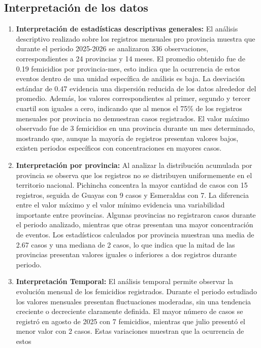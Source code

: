 \documentclass[11pt]{article}
\begin{document}
\subsection{Interpretación de los datos}
\label{sec:orge55c5dd}
\begin{enumerate}
\item \textbf{\textbf{Interpretación de estadísticas descriptivas generales:}}
El análisis descriptivo realizado sobre los registros mensuales pro
provincia muestra que durante el periodo 2025-2026 se analizaron
336 observaciones, correspondientes a 24 provincias y 14 meses. El
promedio obtenido fue de 0.19 femicidios por provincia-mes, esto
indica que la ocurrencia de estos eventos dentro de una unidad
específica de análisis es baja.
La desviación estándar de 0.47 evidencia una dispersión reducida de
los datos alrededor del promedio. Además, los valores
correspondientes al primer, segundo y tercer cuartil son iguales a
cero, indicando que al menos el 75\% de los registros mensuales por
provincia no demuestran casos registrados.
El valor máximo observado fue de 3 femicidios en una provincia
durante un mes determinado, mostrando que, aunque la mayoría de
registros presentan valores bajos, existen periodos específicos con
concentraciones en mayores casos.
\item \textbf{\textbf{Interpretación por provincia:}}
Al analizar la distribución acumulada por provincia se observa que
los registros no se distribuyen uniformemente en el territorio
nacional. Pichincha concentra la mayor cantidad de casos con 15
registros, seguida de Guayas con 9 casos y Esmeraldas con 7.
La diferencia entre el valor máximo y el valor mínimo evidencia una
variabilidad importante entre provincias. Algunas provincias no
registraron casos durante el periodo analizado, mientras que otras
presentan una mayor concentración de eventos.
Los estadísticos calculados por provincia muestran una media de
2.67 casos y una mediana de 2 casos, lo que indica que la mitad de
las provincias presentan valores iguales o inferiores a dos
registros durante periodo.
\item \textbf{\textbf{Interpretación Temporal:}}
El análisis temporal permite observar la evolución mensual de los
femicidios registrados. Durante el periodo estudiado los valores
mensuales presentan fluctuaciones moderadas, sin una tendencia
creciente o decreciente claramente definida.
El mayor número de casos se registró en agosto de 2025 con 7
femicidios, mientras que julio presentó el menor valor con 2
casos. Estas variaciones muestran que la ocurrencia de estos

\end{enumerate}
\end{document}
